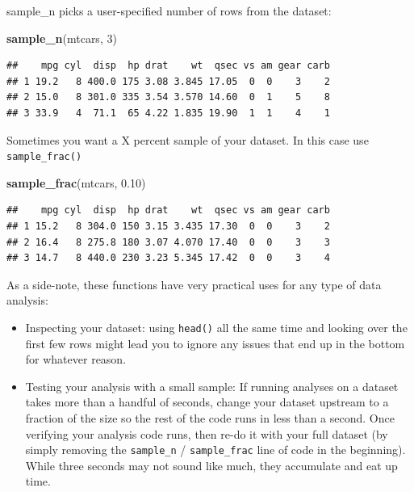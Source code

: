 \documentclass[]{book}
\newenvironment{Shaded}{\begin{snugshade}}{\end{snugshade}}
\newcommand{\DecValTok}[1]{\textcolor[rgb]{0.00,0.00,0.81}{#1}}
\newcommand{\FloatTok}[1]{\textcolor[rgb]{0.00,0.00,0.81}{#1}}
\newcommand{\KeywordTok}[1]{\textcolor[rgb]{0.13,0.29,0.53}{\textbf{#1}}}
\newcommand{\NormalTok}[1]{#1}
\providecommand{\tightlist}{%
  \setlength{\itemsep}{0pt}\setlength{\parskip}{0pt}}
\theoremstyle{definition}
\theoremstyle{definition}
\theoremstyle{definition}
\theoremstyle{remark}
\begin{document}
sample\_n picks a user-specified number of rows from the dataset:

\begin{Shaded}
\begin{Highlighting}[]
\KeywordTok{sample_n}\NormalTok{(mtcars, }\DecValTok{3}\NormalTok{)}
\end{Highlighting}
\end{Shaded}

\begin{verbatim}
##    mpg cyl  disp  hp drat    wt  qsec vs am gear carb
## 1 19.2   8 400.0 175 3.08 3.845 17.05  0  0    3    2
## 2 15.0   8 301.0 335 3.54 3.570 14.60  0  1    5    8
## 3 33.9   4  71.1  65 4.22 1.835 19.90  1  1    4    1
\end{verbatim}

Sometimes you want a X percent sample of your dataset. In this case use \texttt{sample\_frac()}

\begin{Shaded}
\begin{Highlighting}[]
\KeywordTok{sample_frac}\NormalTok{(mtcars, }\FloatTok{0.10}\NormalTok{)}
\end{Highlighting}
\end{Shaded}

\begin{verbatim}
##    mpg cyl  disp  hp drat    wt  qsec vs am gear carb
## 1 15.2   8 304.0 150 3.15 3.435 17.30  0  0    3    2
## 2 16.4   8 275.8 180 3.07 4.070 17.40  0  0    3    3
## 3 14.7   8 440.0 230 3.23 5.345 17.42  0  0    3    4
\end{verbatim}

As a side-note, these functions have very practical uses for any type of data analysis:

\begin{itemize}
\tightlist
\item
  Inspecting your dataset: using \texttt{head()} all the same time and looking over the first few rows might lead you to ignore any issues that end up in the bottom for whatever reason.
\item
  Testing your analysis with a small sample: If running analyses on a dataset takes more than a handful of seconds, change your dataset upstream to a fraction of the size so the rest of the code runs in less than a second. Once verifying your analysis code runs, then re-do it with your full dataset (by simply removing the \texttt{sample\_n} / \texttt{sample\_frac} line of code in the beginning). While three seconds may not sound like much, they accumulate and eat up time.
\end{itemize}
\end{document}
